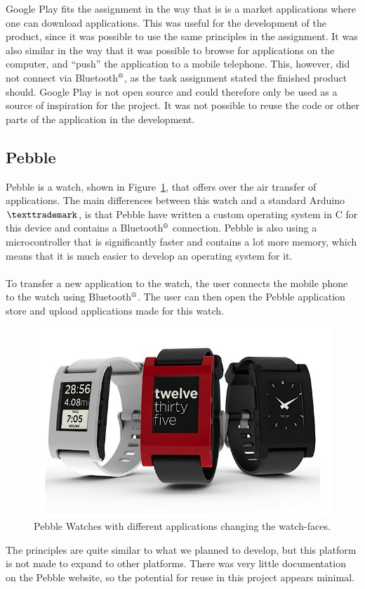 Google Play fits the assignment in the way that is is a market applications where one can download applications. This was useful for the development of the product, since it was possible to use the same principles in the assignment. It was also similar in the way that it was possible to browse for applications on the computer, and ``push'' the application to a mobile telephone. This, however, did not connect via Bluetooth$\textsuperscript{\textregistered}$, as the task assignment stated the finished product should. Google Play is not open source and could therefore only be used as a source of inspiration for the project. It was not possible to reuse the code or other parts of the application in the development.



\subsection{Pebble}
Pebble is a watch, shown in Figure~\ref{fig:pebblewatch}, that offers over the air transfer of applications. The main differences between this watch and a standard Arduino$\texttrademark$, is that Pebble have written a custom operating system in C for this device and contains a Bluetooth$\textsuperscript{\textregistered}$ connection. Pebble is also using a microcontroller that is significantly faster and contains a lot more memory, which means that it is much easier to develop an operating system for it.\\
\\
To transfer a new application to the watch, the user connects the mobile phone to the watch using Bluetooth$\textsuperscript{\textregistered}$. The user can then open the Pebble application store and upload applications made for this watch.

\begin{figure}[H]
\includegraphics[scale=0.7]{images/Pebble-Smartphone-Watch.jpeg}
\caption[Pebble watch]{Pebble Watches with different applications changing the watch-faces.}
\label{fig:pebblewatch}
\end{figure}
The principles are quite similar to what we planned to develop, but this platform is not made to expand to other platforms. There was very little documentation on the Pebble website, so the potential for reuse in this project appears minimal.

